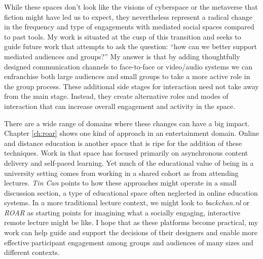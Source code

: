 While these spaces don't look like the visions of cyberspace or the metaverse that fiction might have led us to expect, they nevertheless represent a radical change in the frequency and type of engagements with mediated social spaces compared to past tools. My work is situated at the cusp of this transition and seeks to guide future work that attempts to ask the question: ``how can we better support mediated audiences and groups?'' My answer is that by adding thoughtfully designed communication channels to face-to-face or video/audio systems we can enfranchise both large audiences and small groups to take a more active role in the group process. These additional side stages for interaction need not take away from the main stage. Instead, they create alternative roles and modes of interaction that can increase overall engagement and activity in the space.

There are a wide range of domains where these changes can have a big impact. Chapter \ref{ch:roar} shows one kind of approach in an entertainment domain. Online and distance education is another space that is ripe for the addition of these techniques. Work in that space has focused primarily on asynchronous content delivery and self-paced learning. Yet much of the educational value of being in a university setting comes from working in a shared cohort as from attending lectures. \emph{Tin Can} points to how these approaches might operate in a small discussion section, a type of educational space often neglected in online education systems. In a more traditional lecture context, we might look to  \emph{backchan.nl} or \emph{ROAR} as starting points for imagining what a socially engaging, interactive remote lecture might be like. I hope that as these platforms become practical, my work can help guide and support the decisions of their designers and enable more effective participant engagement among groups and audiences of many sizes and different contexts.



